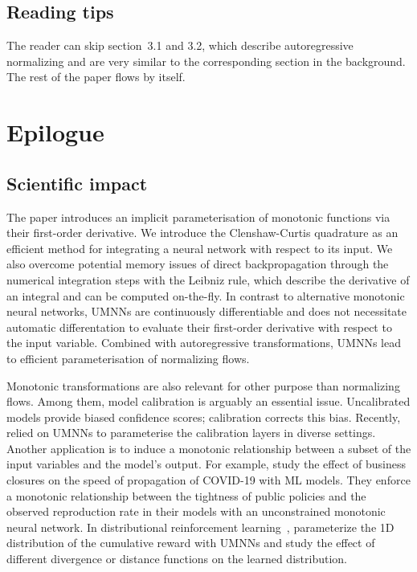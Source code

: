 \subsection{Reading tips}
The reader can skip section~3.1 and 3.2, which describe autoregressive normalizing and are very similar to the corresponding section in the background. The rest of the paper flows by itself.



\section{Epilogue} \label{epi:ch05}

\subsection{Scientific impact}
The paper introduces an implicit parameterisation of monotonic functions via their first-order derivative. We introduce the Clenshaw-Curtis quadrature as an efficient method for integrating a neural network with respect to its input. We also overcome potential memory issues of direct backpropagation through the numerical integration steps with the Leibniz rule, which describe the derivative of an integral and can be computed on-the-fly. In contrast to alternative monotonic neural networks, UMNNs are continuously differentiable and does not necessitate automatic differentation to evaluate their first-order derivative with respect to the input variable. Combined with autoregressive transformations, UMNNs lead to efficient parameterisation of normalizing flows.

Monotonic transformations are also relevant for other purpose than normalizing flows. Among them, model calibration is arguably an essential issue. Uncalibrated models provide biased confidence scores; calibration corrects this bias. Recently, \citet{gruber2022trustworthy, deycalibrated, rahimi2020intra} relied on UMNNs to parameterise the calibration layers in diverse settings. Another application is to induce a monotonic relationship between a subset of the input variables and the model's output. For example, \citet{yurk2021county} study the effect of business closures on the speed of propagation of COVID-19 with ML models. They enforce a monotonic relationship between the tightness of public policies and the observed reproduction rate in their models with an unconstrained monotonic neural network. In distributional reinforcement learning~\citep{dabney2018distributional}, \citet{theate2021distributional} parameterize the 1D distribution of the cumulative reward with UMNNs and study the effect of different divergence or distance functions on the learned distribution.

